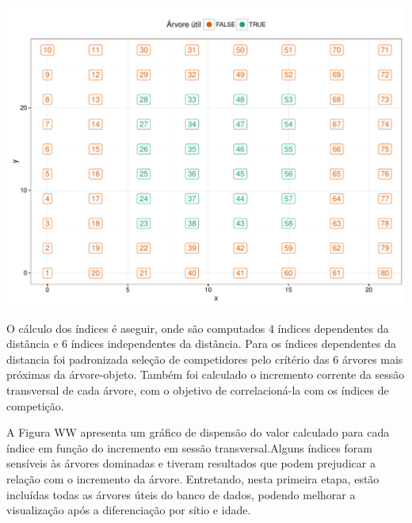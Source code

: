 \documentclass[article]{jss}
\begin{document}
\begin{CodeChunk}


\begin{center}\includegraphics{comp3-paper_files/figure-latex/unnamed-chunk-10-1} \end{center}

\end{CodeChunk}

O cálculo dos índices é aseguir, onde são computados 4 índices
dependentes da distância e 6 índices independentes da distância. Para os
índices dependentes da distancia foi padronizada seleção de competidores
pelo crítério das 6 árvores mais próximas da árvore-objeto. Também foi
calculado o incremento corrente da sessão transversal de cada árvore,
com o objetivo de correlacioná-la com os índices de competição.

A Figura WW apresenta um gráfico de dispensão do valor calculado para
cada índice em função do incremento em sessão transversal.Alguns índices
foram sensíveis às árvores dominadas e tiveram resultados que podem
prejudicar a relação com o incremento da árvore. Entretando, nesta
primeira etapa, estão incluídas todas as árvores úteis do banco de
dados, podendo melhorar a visualização após a diferenciação por sítio e
idade.
\end{document}
